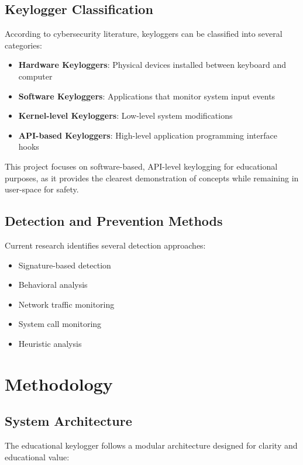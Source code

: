 \documentclass[12pt,a4paper]{article}
\begin{document}
\subsection{Keylogger Classification}

According to cybersecurity literature, keyloggers can be classified into several categories:

\begin{itemize}
    \item \textbf{Hardware Keyloggers}: Physical devices installed between keyboard and computer
    \item \textbf{Software Keyloggers}: Applications that monitor system input events
    \item \textbf{Kernel-level Keyloggers}: Low-level system modifications
    \item \textbf{API-based Keyloggers}: High-level application programming interface hooks
\end{itemize}

This project focuses on software-based, API-level keylogging for educational purposes, as it provides the clearest demonstration of concepts while remaining in user-space for safety.

\subsection{Detection and Prevention Methods}

Current research identifies several detection approaches:
\begin{itemize}
    \item Signature-based detection
    \item Behavioral analysis
    \item Network traffic monitoring
    \item System call monitoring
    \item Heuristic analysis
\end{itemize}

\section{Methodology}

\subsection{System Architecture}

The educational keylogger follows a modular architecture designed for clarity and educational value:
\end{document}
